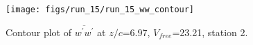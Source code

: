 \begin{figure}[H]
\centering
\texttt{[image: figs/run\_15/run\_15\_ww\_contour]}
\caption{Contour plot of $\overline{w^\prime w^\prime}$ at $z/c$=6.97, $V_{free}$=23.21, station 2.}
\label{fig:run_15_ww_contour}
\end{figure}


